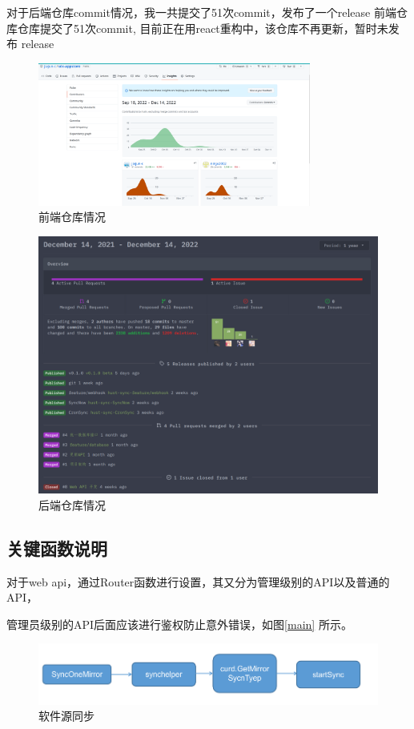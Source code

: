 \documentclass[supercite]{Experimental_Report}
\theoremstyle{definition}
\begin{document}
对于后端仓库commit情况，我一共提交了51次commit，发布了一个release
前端仓库仓库提交了51次commit, 目前正在用react重构中，该仓库不再更新，暂时未发布
release
\begin{figure}[!h]
    \centering
    \includegraphics[width=0.8\textwidth]{./images/hust-front.png}
    \caption{前端仓库情况}
    \label{code}
\end{figure}
\newpage
\begin{figure}[!h]
    \centering
    \includegraphics[width=1\textwidth]{./images/hust.png}
    \caption{后端仓库情况}
    \label{hust}
\end{figure}

\subsection{关键函数说明}

对于web api，通过Router函数进行设置，其又分为管理级别的API以及普通的API，

管理员级别的API后面应该进行鉴权防止意外错误，如图\ref{main} 所示。
\begin{figure}[!h]
    \centering
    \includegraphics[width=1\textwidth]{./images/syncfunc.png}
    \caption{软件源同步}
    \label{syncm}
\end{figure}
\end{document}
